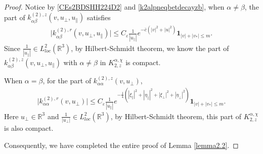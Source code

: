 \documentclass[reqno]{amsart}
\numberwithin{equation}{section}
\numberwithin{equation}{section}
\begin{document}
\begin{proof}
		Notice by \eqref{CEs2BDSHH224D2} and \eqref{k2alpneqbetdecayzb}, when $\alpha \neq \beta$, the part of $k_{\alpha \beta}^{(2),z}(v,u_{\perp},u_{\parallel})$ satisfies
		\begin{align*}
			\big|k_{\alpha \beta}^{(2),r}(v,u_{\perp},u_{\parallel})\big|	\leq C_{\varepsilon}  \frac{1}{|u_{\parallel}|} e^{-\bar{c}(|v|^2+|u|^2)} \mathbf{1}_{|v|+|v_*|\leq m} .
		\end{align*}
		Since $\frac{1}{|u_{\parallel}|}\in L^2_{loc}(\mathbb{R}^3)$, by Hilbert-Schmidt theorem, we know the part of $k_{\alpha \beta}^{(2),z}(v,u_{\perp},u_{\parallel})$ with $\alpha \neq \beta$ in $K_{2,z}^{\alpha,\chi}$ is compact.  
		
		When $\alpha = \beta$, for the part of $k_{\alpha \alpha}^{(2),z}(v,u_{\perp})$,
		\begin{align*}
			\big|k_{\alpha \alpha}^{(2),r}(v,u_{\perp})\big|	\leq C_{\varepsilon}  \frac{1}{|u_{\parallel}|} e^{-\frac{1}{4}(|\xi_{\parallel}|^2+|\eta_{\parallel}|^2+|\xi_{\perp}|^2+|\eta_{\perp}|^2)} \mathbf{1}_{|v|+|v_*|\leq m} .
		\end{align*}
		Here $u_{\perp}\in \mathbb{R}^3$ and $\frac{1}{|u_{\perp}|}\in L^2_{loc}(\mathbb{R}^3)$, by Hilbert-Schmidt theorem, this part of $K_{2,z}^{\alpha,\chi}$ is also compact.
		
		Consequently, we have completed the entire proof of Lemma \ref{lemma2.2}.
	\end{proof}
	
\end{document}
